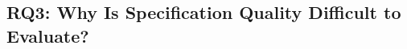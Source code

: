 \documentclass{article}
\theoremstyle{plain}
\theoremstyle{definition}
\theoremstyle{remark}
\begin{document}

\subsection{RQ3: Why Is Specification Quality Difficult to Evaluate?}





\end{document}
